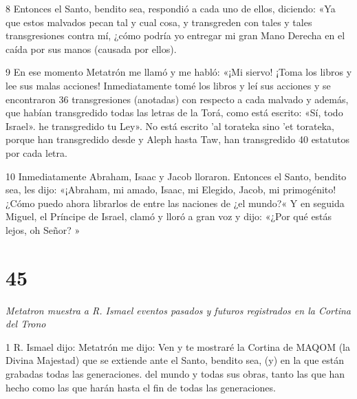 \par 8 Entonces el Santo, bendito sea, respondió a cada uno de ellos, diciendo: «Ya que estos malvados pecan tal y cual cosa, y transgreden con tales y tales transgresiones contra mí, ¿cómo podría yo entregar mi gran Mano Derecha en el caída por sus manos (causada por ellos).

\par 9 En ese momento Metatrón me llamó y me habló: «¡Mi siervo! ¡Toma los libros y lee sus malas acciones! Inmediatamente tomé los libros y leí sus acciones y se encontraron 36 transgresiones (anotadas) con respecto a cada malvado y además, que habían transgredido todas las letras de la Torá, como está escrito: «Sí, todo Israel». he transgredido tu Ley». No está escrito 'al torateka sino 'et torateka, porque han transgredido desde y Aleph hasta Taw, han transgredido 40 estatutos por cada letra.

\par 10 Inmediatamente Abraham, Isaac y Jacob lloraron. Entonces el Santo, bendito sea, les dijo: «¡Abraham, mi amado, Isaac, mi Elegido, Jacob, mi primogénito! ¿Cómo puedo ahora librarlos de entre las naciones de ¿el mundo?« Y en seguida Miguel, el Príncipe de Israel, clamó y lloró a gran voz y dijo: «¿Por qué estás lejos, oh Señor? »


\chapter{45}

\par \textit{Metatron muestra a R. Ismael eventos pasados ​​y futuros registrados en la Cortina del Trono}

\par 1 R. Ismael dijo: Metatrón me dijo: Ven y te mostraré la Cortina de MAQOM (la Divina Majestad) que se extiende ante el Santo, bendito sea, (y) en la que están grabadas todas las generaciones. del mundo y todas sus obras, tanto las que han hecho como las que harán hasta el fin de todas las generaciones.

